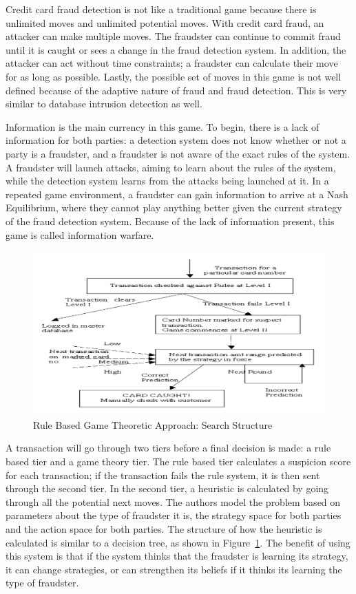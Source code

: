 \documentclass[midd]{thesis}
\begin{document}
Credit card fraud detection is not like a traditional game because there is unlimited moves and unlimited potential moves. With credit card fraud, an attacker can make multiple moves. The fraudster can continue to commit fraud until it is caught or sees a change in the fraud detection system. In addition, the attacker can act without time constraints; a fraudster can calculate their move for as long as possible. Lastly, the possible set of moves in this game is not well defined because of the adaptive nature of fraud and fraud detection. This is very similar to database intrusion detection as well.
  

Information is the main currency in this game. To begin, there is a lack of information for both parties: a detection system does not know whether or not a party is a fraudster, and a fraudster is not aware of the exact rules of the system. A fraudster will launch attacks, aiming to learn about the rules of the system, while the detection system learns from the attacks being launched at it. In a repeated game environment, a fraudster can gain information to arrive at a Nash Equilibrium, where they cannot play anything better given the current strategy of the fraud detection system. Because of the lack of information present, this game is called information warfare.


\begin{figure} \centering
  \includegraphics[scale=0.7]{gametheory.png}
  \caption{Rule Based Game Theoretic Approach: Search Structure \cite{Vatsa2007}}
  \label{fig:gametheory1}
\end{figure}

A transaction will go through two tiers before a final decision is made: a rule based tier and a game theory tier. The rule based tier calculates a suspicion score for each transaction; if the transaction fails the rule system, it is then sent through the second tier. In the second tier, a heuristic is calculated by going through all the potential next moves. The authors model the problem based on parameters about the type of fraudster it is, the strategy space for both parties and the action space for both parties. The structure of how the heuristic is calculated is similar to a decision tree, as shown in Figure~\ref{fig:gametheory1}. The benefit of using this system is that if the system thinks that the fraudster is learning its strategy, it can change strategies, or can strengthen its beliefs if it thinks its learning the type of fraudster.    
\end{document}
